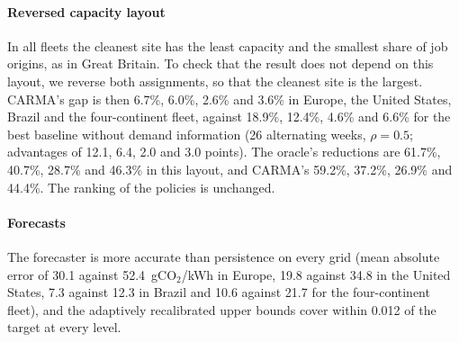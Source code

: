 \paragraph{Reversed capacity layout} In all fleets the cleanest site has the least capacity and the smallest share of job origins, as in Great Britain. To check that the result does not depend on this layout, we reverse both assignments, so that the cleanest site is the largest. CARMA's gap is then 6.7\%, 6.0\%, 2.6\% and 3.6\% in Europe, the United States, Brazil and the four-continent fleet, against 18.9\%, 12.4\%, 4.6\% and 6.6\% for the best baseline without demand information (26 alternating weeks, $\rho=0.5$; advantages of 12.1, 6.4, 2.0 and 3.0 points). The oracle's reductions are 61.7\%, 40.7\%, 28.7\% and 46.3\% in this layout, and CARMA's 59.2\%, 37.2\%, 26.9\% and 44.4\%. The ranking of the policies is unchanged.

\paragraph{Forecasts} The forecaster is more accurate than persistence on every grid (mean absolute error of 30.1 against 52.4~gCO$_2$/kWh in Europe, 19.8 against 34.8 in the United States, 7.3 against 12.3 in Brazil and 10.6 against 21.7 for the four-continent fleet), and the adaptively recalibrated upper bounds cover within 0.012 of the target at every level.
